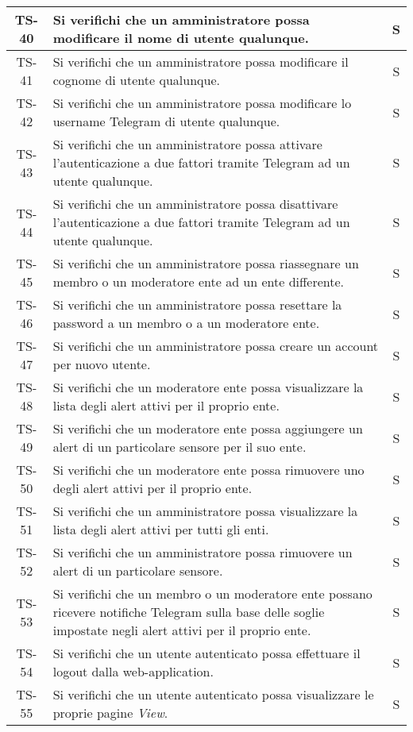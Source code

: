 \begin{center}
\begin{longtable}{|c|p{10cm}|c|}
			 \hline
			 TS-40 & Si verifichi che un amministratore possa modificare il nome di utente qualunque. & S \\
			 \hline
			 TS-41 & Si verifichi che un amministratore possa modificare il cognome di utente qualunque. & S \\
			 \hline
			 TS-42 & Si verifichi che un amministratore possa modificare lo username Telegram di utente qualunque. & S \\
			 \hline
			 TS-43 & Si verifichi che un amministratore possa attivare l'autenticazione a due fattori tramite Telegram ad un utente qualunque. & S \\
			 \hline
			 TS-44 & Si verifichi che un amministratore possa disattivare l'autenticazione a due fattori tramite Telegram ad un utente qualunque. & S \\
			 \hline
			 TS-45 & Si verifichi che un amministratore possa riassegnare un membro o un moderatore ente ad un ente differente. & S \\
			 \hline
			 TS-46 & Si verifichi che un amministratore possa resettare la password a un membro o a un moderatore ente. & S \\
			 \hline
			 TS-47 & Si verifichi che un amministratore possa creare un account per nuovo utente. & S \\
			 \hline
			 TS-48 & Si verifichi che un moderatore ente possa visualizzare la lista degli alert attivi per il proprio ente. & S \\
			 \hline
			 TS-49 & Si verifichi che un moderatore ente possa aggiungere un alert di un particolare sensore per il suo ente. & S \\
			 \hline
			 TS-50 & Si verifichi che un moderatore ente possa rimuovere uno degli alert attivi per il proprio ente. & S \\
			 \hline
			 TS-51 & Si verifichi che un amministratore possa visualizzare la lista degli alert attivi per tutti gli enti. & S \\
			 \hline
			 TS-52 & Si verifichi che un amministratore possa rimuovere un alert di un particolare sensore. & S \\
			 \hline
			 TS-53 & Si verifichi che un membro o un moderatore ente possano ricevere notifiche Telegram sulla base delle soglie impostate negli alert attivi per il proprio ente. & S \\
			 \hline
			 TS-54 & Si verifichi che un utente autenticato possa effettuare il logout dalla web-application. & S \\
			 \hline
			 TS-55 & Si verifichi che un utente autenticato possa visualizzare le proprie pagine \textit{View}. & S \\

\end{longtable}
\end{center}
